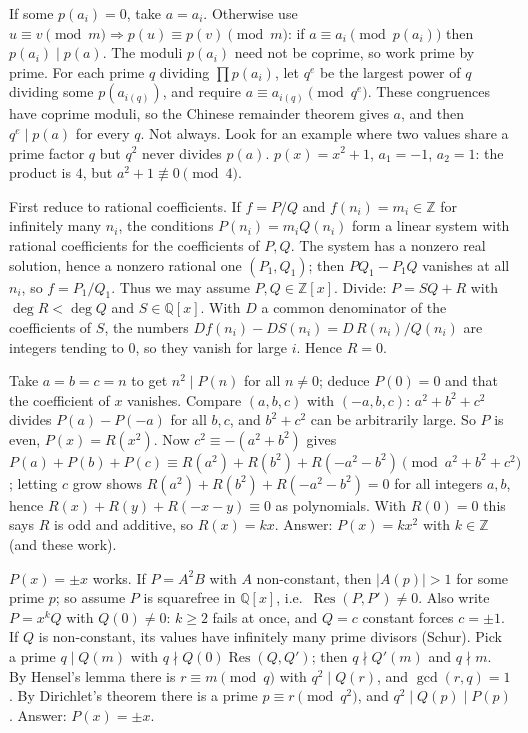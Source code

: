 \documentclass[11pt,a4paper]{article}
\begin{document}

 If some $p(a_i)=0$, take $a=a_i$. Otherwise use $u\equiv v\pmod m\Rightarrow p(u)\equiv p(v)\pmod m$: if $a\equiv a_i\pmod{p(a_i)}$ then $p(a_i)\mid p(a)$. The moduli $p(a_i)$ need not be coprime, so work prime by prime.
 For each prime $q$ dividing $\prod p(a_i)$, let $q^{e}$ be the largest power of $q$ dividing some $p(a_{i(q)})$, and require $a\equiv a_{i(q)}\pmod{q^{e}}$. These congruences have coprime moduli, so the Chinese remainder theorem gives $a$, and then $q^{e}\mid p(a)$ for every $q$.
 Not always. Look for an example where two values share a prime factor $q$ but $q^2$ never divides $p(a)$.
 $p(x)=x^2+1$, $a_1=-1$, $a_2=1$: the product is $4$, but $a^2+1\not\equiv0\pmod4$.

 First reduce to rational coefficients. If $f=P/Q$ and $f(n_i)=m_i\in\mathbb{Z}$ for infinitely many $n_i$, the conditions $P(n_i)=m_iQ(n_i)$ form a linear system with rational coefficients for the coefficients of $P,Q$.
 The system has a nonzero real solution, hence a nonzero rational one $(P_1,Q_1)$; then $PQ_1-P_1Q$ vanishes at all $n_i$, so $f=P_1/Q_1$. Thus we may assume $P,Q\in\mathbb{Z}[x]$.
 Divide: $P=SQ+R$ with $\deg R<\deg Q$ and $S\in\mathbb{Q}[x]$. With $D$ a common denominator of the coefficients of $S$, the numbers $D f(n_i)-DS(n_i)=D\,R(n_i)/Q(n_i)$ are integers tending to $0$, so they vanish for large $i$. Hence $R=0$.

 Take $a=b=c=n$ to get $n^2\mid P(n)$ for all $n\ne0$; deduce $P(0)=0$ and that the coefficient of $x$ vanishes.
 Compare $(a,b,c)$ with $(-a,b,c)$: $a^2+b^2+c^2$ divides $P(a)-P(-a)$ for all $b,c$, and $b^2+c^2$ can be arbitrarily large. So $P$ is even, $P(x)=R(x^2)$.
 Now $c^2\equiv-(a^2+b^2)$ gives $P(a)+P(b)+P(c)\equiv R(a^2)+R(b^2)+R(-a^2-b^2)\pmod{a^2+b^2+c^2}$; letting $c$ grow shows $R(a^2)+R(b^2)+R(-a^2-b^2)=0$ for all integers $a,b$, hence $R(x)+R(y)+R(-x-y)\equiv0$ as polynomials.
 With $R(0)=0$ this says $R$ is odd and additive, so $R(x)=kx$. Answer: $P(x)=kx^2$ with $k\in\mathbb{Z}$ (and these work).

 $P(x)=\pm x$ works. If $P=A^2B$ with $A$ non-constant, then $|A(p)|>1$ for some prime $p$; so assume $P$ is squarefree in $\mathbb{Q}[x]$, i.e.\ $\operatorname{Res}(P,P')\ne0$. Also write $P=x^kQ$ with $Q(0)\ne0$: $k\ge2$ fails at once, and $Q=c$ constant forces $c=\pm1$.
 If $Q$ is non-constant, its values have infinitely many prime divisors (Schur). Pick a prime $q\mid Q(m)$ with $q\nmid Q(0)\operatorname{Res}(Q,Q')$; then $q\nmid Q'(m)$ and $q\nmid m$.
 By Hensel's lemma there is $r\equiv m\pmod q$ with $q^2\mid Q(r)$, and $\gcd(r,q)=1$. By Dirichlet's theorem there is a prime $p\equiv r\pmod{q^2}$, and $q^2\mid Q(p)\mid P(p)$. Answer: $P(x)=\pm x$.
\end{document}
